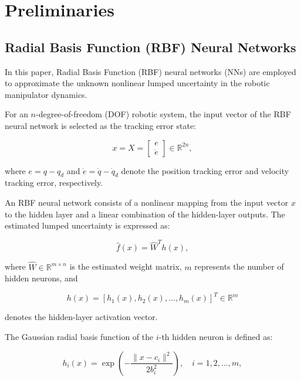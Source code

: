 \section{Preliminaries}

\subsection{Radial Basis Function (RBF) Neural Networks}
\label{subsec:rbf_nn}

In this paper, Radial Basis Function (RBF) neural networks (NNs) are employed to approximate the unknown nonlinear lumped uncertainty in the robotic manipulator dynamics.

For an $n$-degree-of-freedom (DOF) robotic system, the input vector of the RBF neural network is selected as the tracking error state:

\begin{equation}
	x
	=
	X
	=
	\begin{bmatrix}
		e\\
		\dot e
	\end{bmatrix}
	\in\mathbb{R}^{2n},
	\label{eq:rbf_input}
\end{equation}

where $e=q-q_d$ and $\dot e=\dot q-\dot q_d$ denote the position tracking error and velocity tracking error, respectively.

An RBF neural network consists of a nonlinear mapping from the input vector $x$ to the hidden layer and a linear combination of the hidden-layer outputs. The estimated lumped uncertainty is expressed as:

\begin{equation}
	\hat{f}(x)=\hat{W}^{T}h(x),
	\label{eq:rbf_estimation}
\end{equation}

where $\hat{W}\in\mathbb{R}^{m\times n}$ is the estimated weight matrix, $m$ represents the number of hidden neurons, and

\begin{equation}
	h(x)
	=
	[h_1(x),h_2(x),\dots,h_m(x)]^T
	\in\mathbb{R}^{m}
\end{equation}

denotes the hidden-layer activation vector.

The Gaussian radial basis function of the $i$-th hidden neuron is defined as:

\begin{equation}
	h_i(x)
	=
	\exp
	\left(
	-\frac{\|x-c_i\|^2}{2b_i^2}
	\right),
	\quad i=1,2,\dots,m,
\end{equation}


